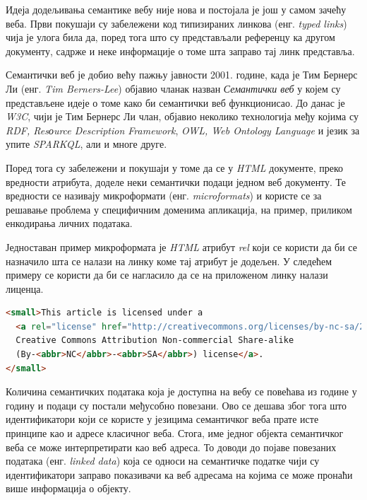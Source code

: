 \documentclass[12pt,oneside]{memoir}
\begin{document}
Идеја додељивања семантике вебу није нова и постојала је још у самом зачећу веба. Први покушаји су забележени код типизираних линкова (енг. \textit{typed links}) чија је улога била да, поред тога што су представљали референцу ка другом документу, садрже и неке информације о томе шта заправо тај линк представља. \cite{semantic}

Семантички веб је добио већу пажњу јавности 2001. године, када је Тим Бернерс Ли (енг. \textit{Tim Berners-Lee}) објавио чланак назван \textit{Семантички веб} у којем су представљене идеје о томе како би семантички веб функционисао. До данас је \textit{W3C}, чији је Тим Бернерс Ли члан, објавио неколико технологија међу којима су \textit{RDF, Resоurce Description Framework}, \textit{OWL, Web Ontology Language} и језик за упите \textit{SPARKQL}, али и многе друге. \cite{semantic}

Поред тога су забележени и покушаји у томе да се у \textit{HTML} документе, преко вредности атрибута, доделе неки семантички подаци једном веб документу. Те вредности се називају микроформати (енг. \textit{microformats}) и користе се за решавање проблема у специфичним доменима апликација, на пример, приликом енкодирања личних података. \cite{semantic}

Једноставан пример микроформата је \textit{HTML} атрибут \textit{rel} који се користи да би се назначило шта се налази на линку коме тај атрибут је додељен. У следећем примеру се користи да би се нагласило да се на приложеном линку налази лиценца.

\begin{lstlisting}[language=HTML]
<small>This article is licensed under a 
  <a rel="license" href="http://creativecommons.org/licenses/by-nc-sa/2.0/">
  Creative Commons Attribution Non-commercial Share-alike 
  (By-<abbr>NC</abbr>-<abbr>SA</abbr>) license</a>.
</small>
\end{lstlisting}

Количина семантичких података која је доступна на вебу се повећава из године у годину и подаци су постали међусобно повезани. Ово се дешава због тога што идентификатори који се користе у језицима семантичког веба прате исте принципе као и адресе класичног веба. Стога, име једног објекта семантичког веба се може интерпретирати као веб адреса. То доводи до појаве повезаних података (енг. \textit{linked data}) која се односи на семантичке податке чији су идентификатори заправо показивачи ка веб адресама на којима се може пронаћи више информација о објекту. \cite{semantic}
\end{document}
